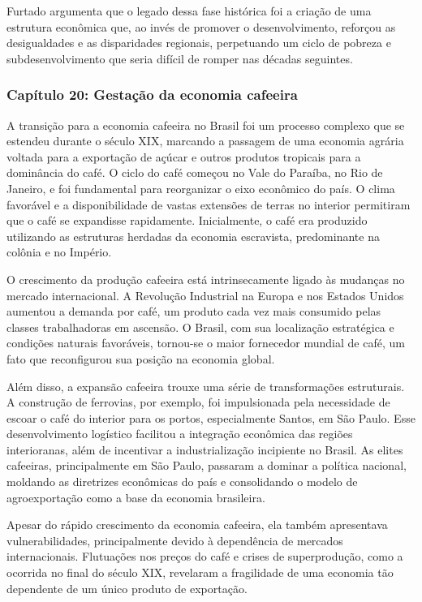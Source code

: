 \documentclass[a4paper,12pt]{article}[abntex2]
\begin{document}
Furtado argumenta que o legado dessa fase histórica foi a criação de uma estrutura econômica que, ao invés de promover o desenvolvimento, reforçou as desigualdades e as disparidades regionais, perpetuando um ciclo de pobreza e subdesenvolvimento que seria difícil de romper nas décadas seguintes.

\subsubsection{\textbf{Capítulo 20: Gestação da economia cafeeira}}

A transição para a economia cafeeira no Brasil foi um processo complexo que se estendeu durante o século XIX, marcando a passagem de uma economia agrária voltada para a exportação de açúcar e outros produtos tropicais para a dominância do café. O ciclo do café começou no Vale do Paraíba, no Rio de Janeiro, e foi fundamental para reorganizar o eixo econômico do país. O clima favorável e a disponibilidade de vastas extensões de terras no interior permitiram que o café se expandisse rapidamente. Inicialmente, o café era produzido utilizando as estruturas herdadas da economia escravista, predominante na colônia e no Império.

O crescimento da produção cafeeira está intrinsecamente ligado às mudanças no mercado internacional. A Revolução Industrial na Europa e nos Estados Unidos aumentou a demanda por café, um produto cada vez mais consumido pelas classes trabalhadoras em ascensão. O Brasil, com sua localização estratégica e condições naturais favoráveis, tornou-se o maior fornecedor mundial de café, um fato que reconfigurou sua posição na economia global.

Além disso, a expansão cafeeira trouxe uma série de transformações estruturais. A construção de ferrovias, por exemplo, foi impulsionada pela necessidade de escoar o café do interior para os portos, especialmente Santos, em São Paulo. Esse desenvolvimento logístico facilitou a integração econômica das regiões interioranas, além de incentivar a industrialização incipiente no Brasil. As elites cafeeiras, principalmente em São Paulo, passaram a dominar a política nacional, moldando as diretrizes econômicas do país e consolidando o modelo de agroexportação como a base da economia brasileira.

Apesar do rápido crescimento da economia cafeeira, ela também apresentava vulnerabilidades, principalmente devido à dependência de mercados internacionais. Flutuações nos preços do café e crises de superprodução, como a ocorrida no final do século XIX, revelaram a fragilidade de uma economia tão dependente de um único produto de exportação.
\end{document}
